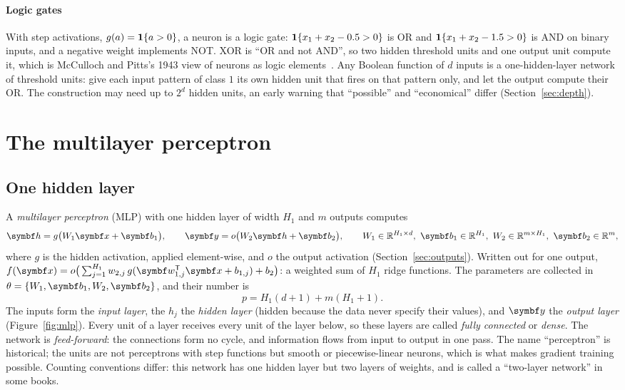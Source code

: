 \documentclass[11pt]{article}
\newcommand{\w}{\vect{w}}
\newcommand{\hv}{\vect{h}}
\newcommand{\y}{\vect{y}}
\newcommand{\vb}{\vect{b}}
\begin{document}
\paragraph{Logic gates} With step activations, $g(a) = \mathbf{1}\!\left\{a > 0\right\}$, a neuron is a logic gate: $\mathbf{1}\!\left\{x_1 + x_2 - 0.5 >
0\right\}$ is OR and $\mathbf{1}\!\left\{x_1 + x_2 - 1.5 > 0\right\}$ is AND on binary inputs, and a negative weight implements NOT. XOR is ``OR and
not AND'', so two hidden threshold units and one output unit compute it, which is McCulloch and Pitts's 1943 view of
neurons as logic elements~\cite{mcculloch1943}. Any Boolean function of $d$ inputs is a one-hidden-layer network of
threshold units: give each input pattern of class $1$ its own hidden unit that fires on that pattern only, and let the
output compute their OR. The construction may need up to $2^d$ hidden units, an early warning that ``possible'' and
``economical'' differ (Section~\ref{sec:depth}).

\section{The multilayer perceptron}\label{sec:mlp}

\subsection{One hidden layer}\label{sec:onehidden}

A \emph{multilayer perceptron} (MLP) with one hidden layer of width $H_1$ and $m$ outputs computes
\begin{equation}\label{eq:mlp1}
  \hv = g\big(W_1\x + \vb_1\big), \qquad \y = o\big(W_2\hv + \vb_2\big),
  \qquad W_1 \in \R^{H_1 \times d},\ \vb_1 \in \R^{H_1},\ W_2 \in \R^{m \times H_1},\ \vb_2 \in \R^m ,
\end{equation}
where $g$ is the hidden activation, applied element-wise, and $o$ the output activation (Section~\ref{sec:outputs}).
Written out for one output, $f(\x) = o\big(\sum_{j=1}^{H_1} w_{2,j}\, g(\w_{1,j}\T\x + b_{1,j}) + b_2\big)$: a weighted sum of
$H_1$ ridge functions. The parameters are collected in $\theta = \{W_1, \vb_1, W_2, \vb_2\}$, and their number is
\begin{equation}\label{eq:count1}
  p = H_1(d + 1) + m(H_1 + 1) .
\end{equation}
The inputs form the \emph{input layer}, the $h_j$ the \emph{hidden layer} (hidden because the data never specify their
values), and $\y$ the \emph{output layer} (Figure~\ref{fig:mlp}). Every unit of a layer receives every unit of the layer
below, so these layers are called \emph{fully connected} or \emph{dense}. The network is \emph{feed-forward}: the
connections form no cycle, and information flows from input to output in one pass. The name ``perceptron'' is
historical; the units are not perceptrons with step functions but smooth or piecewise-linear neurons, which is what
makes gradient training possible. Counting conventions differ: this network has one hidden layer but two layers of
weights, and is called a ``two-layer network'' in some books.
\end{document}
